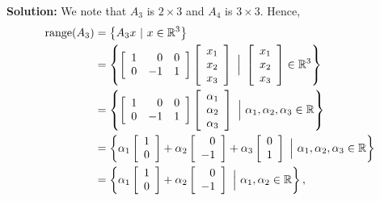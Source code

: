 \textbf{Solution:} We note that $A_3$ is $2 \times 3$ and $A_4$ is $3 \times 3$. Hence, 
\begin{align*}
    \range(A_3)&= \left\{ A_3 x~|~ x \in \real^3  \right\} \medskip \\
    &=  \left\{ \left[\begin{array}{rrc}  1 & 0 & 0 \\  0 & -1 & 1 \\ \end{array} \right] \left[\begin{array}{c}  x_1 \\ x_2 \\ x_3\\ \end{array} \right]~\Big|~ \left[\begin{array}{c}  x_1 \\ x_2 \\ x_3\\ \end{array} \right] \in \real^3  \right\} \medskip \\
    &=  \left\{ \left[\begin{array}{rrc}  1 & 0 & 0 \\  0 & -1 & 1 \\ \end{array} \right] \left[\begin{array}{c}  \alpha_1 \\ \alpha_2 \\ \alpha_3\\ \end{array} \right]~\Big|~  \alpha_1, \alpha_2, \alpha_3 \in \real \right\} \medskip\\
    &=  \left\{ \alpha_1 \left[\begin{array}{r}  1 \\ 0 \end{array} \right] + \alpha_2 \left[\begin{array}{r}  0 \\ -1 \end{array} \right] + \alpha_3 \left[\begin{array}{c}  0 \\ 1 \end{array} \right]~\Big|~  \alpha_1, \alpha_2, \alpha_3 \in \real \right\} \medskip \\
     &=  \left\{ \alpha_1 \left[\begin{array}{r}  1 \\ 0 \end{array} \right] + \alpha_2 \left[\begin{array}{r}  0 \\ -1 \end{array} \right] ~\Big|~  \alpha_1, \alpha_2 \in \real \right\}, 
\end{align*}
